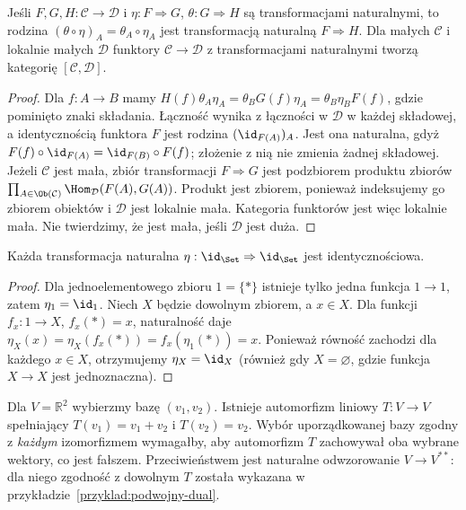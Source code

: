 \begin{stwierdzenie}\label{cat:prop:vertical}
Jeśli $F,G,H:\mathcal C\to\mathcal D$ i $\eta:F\Rightarrow G$, $\theta:G\Rightarrow H$ są transformacjami naturalnymi, to rodzina $(\theta\circ\eta)_A=\theta_A\circ\eta_A$ jest transformacją naturalną $F\Rightarrow H$. Dla małych $\mathcal C$ i lokalnie małych $\mathcal D$ funktory $\mathcal C\to\mathcal D$ z transformacjami naturalnymi tworzą kategorię $[\mathcal C,\mathcal D]$.
\end{stwierdzenie}
\begin{proof}
Dla $f:A\to B$ mamy $H(f)\theta_A\eta_A=\theta_B G(f)\eta_A=\theta_B\eta_B F(f)$, gdzie pominięto znaki składania. Łączność wynika z łączności w $\mathcal D$ w każdej składowej, a identycznością funktora $F$ jest rodzina $(\id_{F(A)})_A$. Jest ona naturalna, gdyż $F(f)\circ\id_{F(A)}=\id_{F(B)}\circ F(f)$; złożenie z nią nie zmienia żadnej składowej. Jeżeli $\mathcal C$ jest mała, zbiór transformacji $F\Rightarrow G$ jest podzbiorem produktu zbiorów $\prod_{A\in\Ob(\mathcal C)}\Hom_{\mathcal D}(F(A),G(A))$. Produkt jest zbiorem, ponieważ indeksujemy go zbiorem obiektów i $\mathcal D$ jest lokalnie mała. Kategoria funktorów jest więc lokalnie mała. Nie twierdzimy, że jest mała, jeśli $\mathcal D$ jest duża.
\end{proof}


\begin{twierdzenie}\label{tw:only-id-set}
Każda transformacja naturalna $\eta:\id_{\Set}\Rightarrow\id_{\Set}$ jest identycznościowa.
\end{twierdzenie}
\begin{proof}
Dla jednoelementowego zbioru $1=\{*\}$ istnieje tylko jedna funkcja $1\to1$, zatem $\eta_1=\id_1$. Niech $X$ będzie dowolnym zbiorem, a $x\in X$. Dla funkcji $f_x:1\to X$, $f_x(*)=x$, naturalność daje $\eta_X(x)=\eta_X(f_x(*))=f_x(\eta_1(*))=x$. Ponieważ równość zachodzi dla każdego $x\in X$, otrzymujemy $\eta_X=\id_X$ (również gdy $X=\varnothing$, gdzie funkcja $X\to X$ jest jednoznaczna).
\end{proof}

\begin{przyklad}
Dla $V=\mathbb R^2$ wybierzmy bazę $(v_1,v_2)$. Istnieje automorfizm liniowy $T:V\to V$ spełniający $T(v_1)=v_1+v_2$ i $T(v_2)=v_2$. Wybór uporządkowanej bazy zgodny z \emph{każdym} izomorfizmem wymagałby, aby automorfizm $T$ zachowywał oba wybrane wektory, co jest fałszem. Przeciwieństwem jest naturalne odwzorowanie $V\to V^{**}$: dla niego zgodność z dowolnym $T$ została wykazana w przykładzie~\ref{przyklad:podwojny-dual}.
\end{przyklad}

